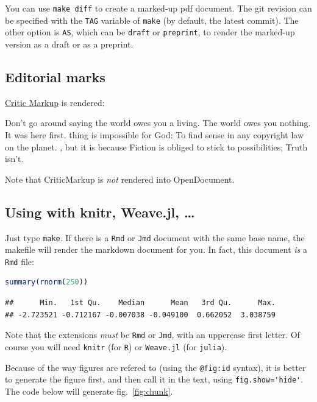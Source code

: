 \documentclass[12pt]{article}
\begin{document}
You can use \lstinline!make diff! to create a marked-up pdf document.
The git revision can be specified with the \lstinline!TAG! variable of
\lstinline!make! (by default, the latest commit). The other option is
\lstinline!AS!, which can be \lstinline!draft! or \lstinline!preprint!,
to render the marked-up version as a draft or as a preprint.

\subsection{Editorial marks}\label{editorial-marks}

\href{http://criticmarkup.com/}{Critic Markup} is rendered:

Don't go around saying the world owes you a
living. The world owes you nothing. It was here first.
 thing is impossible for God: To find
 sense in any copyright law on the planet.
, but it is because Fiction is obliged to stick to possibilities;
Truth isn't.

Note that CriticMarkup is \emph{not} rendered into OpenDocument.

\subsection{Using with knitr, Weave.jl,
\ldots{}}\label{using-with-knitr-weave.jl}

Just type \lstinline!make!. If there is a \lstinline!Rmd! or
\lstinline!Jmd! document with the same base name, the makefile will
render the markdown document for you. In fact, this document \emph{is} a
\lstinline!Rmd! file:

\begin{lstlisting}[language=R]
summary(rnorm(250))
\end{lstlisting}

\begin{lstlisting}
##      Min.   1st Qu.    Median      Mean   3rd Qu.      Max. 
## -2.723521 -0.712167 -0.007038 -0.049100  0.662052  3.038759
\end{lstlisting}

Note that the extensions \emph{must} be \lstinline!Rmd! or
\lstinline!Jmd!, with an uppercase first letter. Of course you will need
\lstinline!knitr! (for \lstinline!R!) or \lstinline!Weave.jl! (for
\lstinline!julia!).

Because of the way figures are refered to (using the \lstinline!@fig:id!
syntax), it is better to generate the figure first, and then call it in
the text, using \lstinline!fig.show='hide'!. The code below will
generate fig.~\ref{fig:chunk}.
\end{document}
